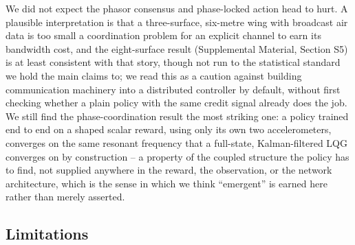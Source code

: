 \documentclass[journal]{new-aiaa}
\begin{document}
We did not expect the phasor consensus and phase-locked action head to
hurt. A plausible interpretation is that a three-surface, six-metre wing
with broadcast air data is too small a coordination problem for an
explicit channel to earn its bandwidth cost, and the eight-surface result
(Supplemental Material, Section S5) is at least consistent with that
story, though not run to the statistical standard we hold the main claims
to; we read this as a caution against building communication machinery
into a distributed controller by default, without first checking whether a
plain policy with the same credit signal already does the job. We still
find the phase-coordination result the most striking one: a policy trained
end to end on a shaped scalar reward, using only its own two
accelerometers, converges on the same resonant frequency that a
full-state, Kalman-filtered LQG converges on by construction -- a property
of the coupled structure the policy has to find, not supplied anywhere in
the reward, the observation, or the network architecture, which is the
sense in which we think ``emergent'' is earned here rather than merely
asserted.

\subsection{Limitations}
\label{sec:limitations}
\end{document}
